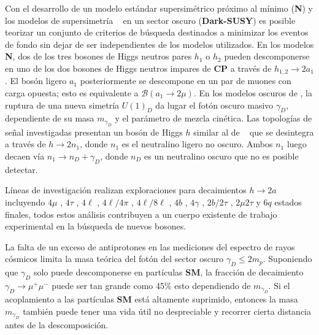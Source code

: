 Con el desarrollo de un modelo estándar supersimétrico próximo al mínimo (\textbf{N}\MSSM) y los modelos de supersimetría \SUSY ~ en un sector oscuro (\textbf{Dark-SUSY}) es posible teorizar un conjunto de criterios de búsqueda destinados a minimizar los eventos de fondo sin dejar de ser independientes de los modelos utilizados. En los modelos \textbf{N}\MSSM, dos de los tres bosones de Higgs neutros pares $h_1$ o $h_2$  pueden descomponerse en uno de los dos bosones de Higgs neutros impares de \textbf{CP} a través de $h_{1,2} \rightarrow 2a_1$. El bosón ligero $a_1$ posteriormente se descompone en un par de muones con carga opuesta; esto es equivalente a $\mathcal{B}(a_1 \rightarrow 2\mu)$. En los modelos oscuros de \SUSY, la ruptura de una nueva simetría $U(1)_D$ da lugar el fotón oscuro masivo $\gamma_D$, dependiente de su masa $m_{\gamma_D}$ y el parámetro de mezcla cinética. Las topologías de señal investigadas presentan un bosón de Higgs $h$ similar al de \ME ~ que se desintegra a través de $h \rightarrow 2n_1$, donde $n_1$ es el neutralino ligero no oscuro. Ambos $n_1$ luego decaen vía $n_1 \rightarrow n_D + \gamma_D$, donde $n_D$ es un neutralino oscuro que no es posible detectar. 

Líneas de investigación realizan exploraciones para decaimientos $h \rightarrow 2a$ incluyendo $4\mu$ \citep{cms_collaboration_search_2016,cms_collaboration_search_2013}
, $4\tau$ %
, $4\ell$ %
, $4\ell/4\pi$ \citep{aad_search_2014}
, $4\ell/8\ell$ \citep{aad_search_2016}, $4b$ \citep{aaboud_search_2018-1}, $4\gamma$ \citep{aad_search_2016-1}
, $2b/2\tau$ %
, $2\mu 2\tau$ y $6q$ %
estados finales, todos estos análisis contribuyen a un cuerpo existente de trabajo experimental en la búsqueda de nuevos bosones.

La falta de un exceso de antiprotones en las mediciones del espectro de rayos cósmicos limita la masa teórica del fotón del sector oscuro $\gamma_D\leq 2m_p$. Suponiendo que $\gamma_D$ solo puede descomponerse en partículas \textbf{SM}, la fracción de decaimiento $\gamma_D\rightarrow \mu^+\mu^-$ puede ser tan grande como 45\% esto dependiendo de $m_{\gamma_D}$. Si el acoplamiento a las partículas \textbf{SM} está altamente suprimido, entonces la masa $m_{\gamma_D}$ también puede tener una vida útil no despreciable y recorrer cierta distancia antes de la descomposición. %

